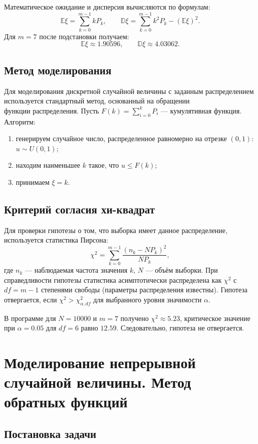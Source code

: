 \documentclass[bachelor, och, pract3]{SCWorks}
\begin{document}
Математическое ожидание и дисперсия вычисляются по формулам:
\[
\mathbb E\xi = \sum_{k=0}^{m-1} k P_k, \qquad
\mathbb D\xi = \sum_{k=0}^{m-1} k^2 P_k - (\mathbb E\xi)^2.
\]
Для $m=7$ после подстановки получаем:
\[
\mathbb E\xi \approx 1.90596, \qquad \mathbb D\xi \approx 4.03062.
\]

\subsection{Метод моделирования}

Для моделирования дискретной случайной величины с заданным распределением используется стандартный метод, основанный на обращении \\ функции распределения. Пусть $F(k) = \sum_{i=0}^{k} P_i$ — кумулятивная функция. Алгоритм:
\begin{enumerate}
    \item генерируем случайное число, распределенное равномерно на отрезке $(0,1)$: $u \sim U(0,1)$;
    \item находим наименьшее $k$ такое, что $u \le F(k)$;
    \item принимаем $\xi = k$.
\end{enumerate}

\subsection{Критерий согласия хи-квадрат}

Для проверки гипотезы о том, что выборка имеет данное распределение, используется статистика Пирсона:
\[
\chi^2 = \sum_{k=0}^{m-1} \frac{(n_k - N P_k)^2}{N P_k},
\]
где $n_k$ — наблюдаемая частота значения $k$, $N$ — объём выборки. При справедливости гипотезы статистика асимптотически распределена как $\chi^2$ с $df = m-1$ степенями свободы (параметры распределения известны). Гипотеза отвергается, если $\chi^2 > \chi^2_{\alpha, df}$ для выбранного уровня значимости $\alpha$.

В программе для $N=10000$ и $m=7$ получено $\chi^2 \approx 5.23$, критическое значение при $\alpha=0.05$ для $df=6$ равно $12.59$. Следовательно, гипотеза не отвергается.




\section{Моделирование непрерывной случайной величины. Метод обратных функций}

\subsection{Постановка задачи}
\end{document}
